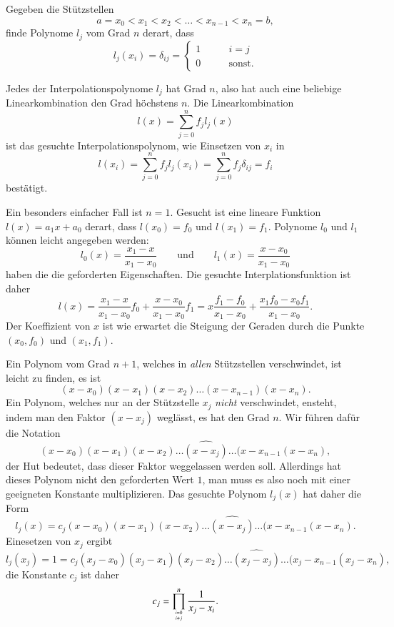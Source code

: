 \begin{aufgabe}
Gegeben die Stützstellen
\[
a=x_0<x_1<x_2<\dots <x_{n-1}<x_n=b,
\]
finde Polynome $l_j$ vom Grad $n$ derart, dass
\[
l_j(x_i) = \delta_{ij}=\begin{cases}
1&\qquad i=j\\
0&\qquad\text{sonst.}
\end{cases}
\]
\end{aufgabe}

Jedes der Interpolationspolynome $l_j$ hat Grad $n$, also hat auch eine
beliebige Linearkombination den Grad höchstens $n$.
Die Linearkombination
\[
l(x) = \sum_{j=0}^n f_j l_j(x)
\]
ist das gesuchte Interpolationspolynom, wie Einsetzen von $x_i$ in
\[
l(x_i)
=
\sum_{j=0}^n f_jl_j(x_i)
=
\sum_{j=0}^n f_j\delta_{ij}
=
f_i
\]
bestätigt.

\begin{beispiel}
Ein besonders einfacher Fall ist $n=1$.
Gesucht ist eine lineare Funktion $l(x)=a_1x+a_0$ derart, dass
$l(x_0)=f_0$ und $l(x_1)=f_1$.
Polynome $l_0$ und $l_1$ können leicht angegeben werden:
\[
l_0(x) = \frac{x_1-x}{x_1-x_0}
\qquad\text{und}\qquad
l_1(x) = \frac{x-x_0}{x_1-x_0}
\]
haben die die geforderten Eigenschaften.
Die gesuchte Interplationsfunktion ist daher
\[
l(x)
=
\frac{x_1-x}{x_1-x_0}f_0 + \frac{x-x_0}{x_1-x_0} f_1
=
x \frac{f_1-f_0}{x_1-x_0}   + \frac{x_1f_0-x_0f_1}{x_1-x_0}.
\]
Der Koeffizient von $x$ ist wie erwartet die Steigung der Geraden durch
die Punkte $(x_0,f_0)$ und $(x_1,f_1)$.
\end{beispiel}

Ein Polynom vom Grad $n+1$, welches in {\em allen} Stützstellen verschwindet,
ist leicht zu finden, es ist 
\[
(x-x_0)(x-x_1)(x-x_2)\dots (x-x_{n-1})(x-x_n).
\]
Ein Polynom, welches nur an der Stützstelle $x_j$ {\em nicht} verschwindet,
ensteht, indem man den Faktor $(x-x_j)$ weglässt, es hat den Grad $n$.
Wir führen dafür die Notation
\[
(x-x_0)(x-x_1)(x-x_2)\dots \widehat{(x-x_j)}\dots (x-x_{n-1}(x-x_n),
\]
der Hut bedeutet, dass dieser Faktor weggelassen werden soll.
Allerdings hat dieses Polynom nicht den geforderten Wert $1$, man muss es
also noch mit einer geeigneten Konstante multiplizieren.
Das gesuchte Polynom $l_j(x)$ hat daher die Form
\[
l_j(x)
=
c_j(x-x_0)(x-x_1)(x-x_2)\dots \widehat{(x-x_j)}\dots (x-x_{n-1}(x-x_n).
\]
Einesetzen von $x_j$ ergibt
\[
l_j(x_j) = 1 = 
c_j(x_j-x_0)(x_j-x_1)(x_j-x_2)\dots \widehat{(x_j-x_j)}\dots(x_j-x_{n-1}(x_j-x_n),
\]
die Konstante $c_j$ ist daher
\[
c_j = \prod_{i=0\atop i\ne j}^n \frac{1}{x_j-x_i}.
\]

